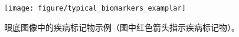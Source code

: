 \begin{figure}[h]
	\centering
	\texttt{[image: figure/typical\_biomarkers\_examplar]}
	\caption[眼底图像中的疾病标记物示例]{眼底图像中的疾病标记物示例（图中红色箭头指示疾病标记物）。}
	\label{mul_fig:medical_imaging_biomarkers_examplar}
\end{figure}






